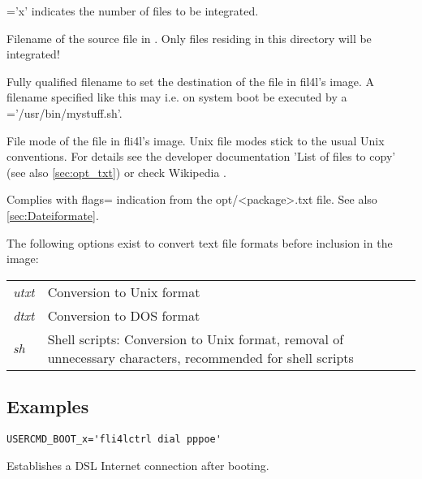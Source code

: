\begin{description}
   ='x' indicates the number of files to be integrated.


    Filename of the source file in . Only files
    residing in this directory will be integrated!


    Fully qualified filename to set the destination of the file in
    fil4l's image. A filename specified like this may i.e. on system boot
    be executed by a\\
    ='/usr/bin/mystuff.sh'.


    File mode of the file in fli4l's image. Unix file modes stick to the
    usual Unix conventions. For details see the developer documentation
    'List of files to copy' (see also \ref{sec:opt_txt}) or check Wikipedia
    .


    Complies with flags= indication from the opt/<package>.txt file.
    See also \ref{sec:Dateiformate}.

    The following options exist to convert text file formats before inclusion in the image:
    \newline\newline
    \begin{tabular}{lp{6cm}}
        \emph{utxt} & Conversion to Unix format\\
        \emph{dtxt} & Conversion to DOS format\\
        \emph{sh}   & Shell scripts: Conversion to Unix format, removal of unnecessary characters,
        recommended for shell scripts
    \end{tabular}

\end{description}

\subsection{Examples}

\begin{verbatim}
USERCMD_BOOT_x='fli4lctrl dial pppoe'
\end{verbatim}
Establishes a DSL Internet connection after booting.


